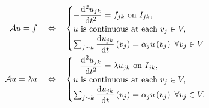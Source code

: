 \begin{align*}
	\mathcal{A}u = f \quad\Leftrightarrow\quad &
	\begin{cases}
		-\dfrac{\mathrm{d}^2 u_{jk}}{\mathrm{d} {t}^2} = f_{jk} \ \text{on } I_{jk}, \\
		u \text{ is continuous at each } v_j\in V, \\
		\sum_{j\sim k}\dfrac{\mathrm{d}u_{jk}}{\mathrm{d}t}\left( v_j \right) = \alpha_j u\left( v_j \right) \ \forall v_j\in V
	\end{cases} \\
	\mathcal{A}u = \lambda u \quad\Leftrightarrow\quad &
	\begin{cases}
		-\dfrac{\mathrm{d}^2 u_{jk}}{\mathrm{d} {t}^2} = \lambda u_{jk} \ \text{on } I_{jk}, \\
		u \text{ is continuous at each } v_j\in V, \\
		\sum_{j\sim k}\dfrac{\mathrm{d}u_{jk}}{\mathrm{d}t}\left( v_j \right) = \alpha_j u\left( v_j \right) \ \forall v_j\in V.
	\end{cases}
\end{align*}


